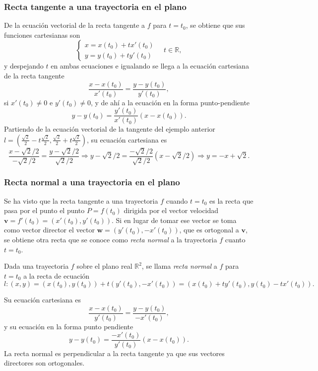 \begin{frame}
\frametitle{Recta tangente a una trayectoria en el plano}
De la ecuación vectorial de la recta tangente a $f$ para $t=t_0$, se obtiene que sus funciones cartesianas son
\[
\begin{cases}
x=x(t_0)+tx'(t_0)\\
y=y(t_0)+ty'(t_0)
\end{cases}
\quad t\in \mathbb{R},
\]
y despejando $t$ en ambas ecuaciones e igualando se llega a la ecuación cartesiana de la recta tangente
\[
\frac{x-x(t_0)}{x'(t_0)}=\frac{y-y(t_0)}{y'(t_0)},
\]
si $x'(t_0)\neq 0$ e $y'(t_0)\neq 0$, y de ahí a la ecuación en la forma punto-pendiente
\[
y-y(t_0)=\frac{y'(t_0)}{x'(t_0)}(x-x(t_0)).
\]
Partiendo de la ecuación vectorial de la tangente del ejemplo anterior
$l=\left(\frac{\sqrt{2}}{2}-t\frac{\sqrt{2}}{2},\frac{\sqrt{2}}{2}+t\frac{\sqrt{2}}{2}\right)$, su ecuación cartesiana
es
\[
\frac{x-\sqrt{2}/2}{-\sqrt{2}/2} = \frac{y-\sqrt{2}/2}{\sqrt{2}/2}\Rightarrow y-\sqrt{2}/2 =
\frac{-\sqrt{2}/2}{\sqrt{2}/2}(x-\sqrt{2}/2) \Rightarrow y=-x+\sqrt{2}.
\]
\end{frame}


\begin{frame}
\frametitle{Recta normal a una trayectoria en el plano}
Se ha visto que la recta tangente a una trayectoria $f$ cuando $t=t_0$ es la recta que pasa por el punto el punto
$P=f(t_0)$ dirigida por el vector velocidad $\mathbf{v}=f'(t_0)=(x'(t_0),y'(t_0))$. Si en lugar de tomar ese vector se
toma como vector director el vector $\mathbf{w}=(y'(t_0),-x'(t_0))$, que es ortogonal a $\mathbf{v}$, se obtiene otra
recta que se conoce como \emph{recta normal} a la trayectoria $f$ cuanto $t=t_0$.
\begin{definicion}
Dada una trayectoria $f$ sobre el plano real $\mathbb{R}^2$, se llama \emph{recta normal} a $f$ para $t=t_0$ a la recta de ecuación 
\[
l: (x,y)=(x(t_0),y(t_0))+t(y'(t_0),-x'(t_0)) = (x(t_0)+ty'(t_0),y(t_0)-tx'(t_0)). 
\]
\end{definicion}
Su ecuación cartesiana es
\[
\frac{x-x(t_0)}{y'(t_0)} = \frac{y-y(t_0)}{-x'(t_0)},
\]
y su ecuación en la forma punto pendiente
\[
y-y(t_0) = \frac{-x'(t_0)}{y'(t_0)}(x-x(t_0)).
\]
La recta normal es perpendicular a la recta tangente ya que sus vectores directores son ortogonales. 
\end{frame}


